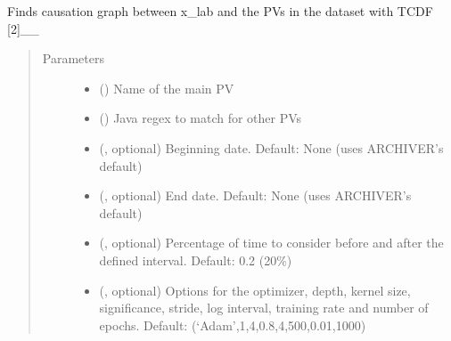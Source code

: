 \documentclass[letterpaper,10pt,english]{sphinxmanual}
\begin{document}
\begin{fulllineitems}
\begin{fulllineitems}
\label{\detokenize{dataset:dataset.Dataset.causation_EPICS}}
\sphinxAtStartPar
Finds causation graph between x\_lab and the PVs in the dataset with TCDF {[}2{]}\_\_
\begin{quote}\begin{description}
\item[{Parameters}] \leavevmode\begin{itemize}
\item {} 
\sphinxAtStartPar
{} () \textendash{} Name of the main PV

\item {} 
\sphinxAtStartPar
{} () \textendash{} Java regex to match for other PVs

\item {} 
\sphinxAtStartPar
{} (, optional) \textendash{} Beginning date. Default: None (uses ARCHIVER’s default)

\item {} 
\sphinxAtStartPar
{} (, optional) \textendash{} End date. Default: None (uses ARCHIVER’s default)

\item {} 
\sphinxAtStartPar
{} (, optional) \textendash{} Percentage of time to consider before and after the defined interval. Default: 0.2 (20\%)

\item {} 
\sphinxAtStartPar
{} (, optional) \textendash{} Options for the optimizer, depth, kernel size, significance, stride, log interval, training rate and number of epochs. Default: (‘Adam’,1,4,0.8,4,500,0.01,1000)


\end{itemize}
\end{description}
\end{quote}
\end{fulllineitems}
\end{fulllineitems}
\end{document}
